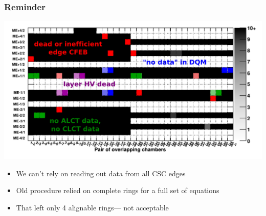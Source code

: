 \documentclass[compress]{beamer}
\begin{document}
\begin{frame}
\frametitle{Reminder}

\includegraphics[width=\linewidth]{occupancy_problems.pdf}

\begin{itemize}
\item We can't rely on reading out data from all CSC edges
\item Old procedure relied on complete rings for a full set of equations
\item That left only 4 alignable rings--- not acceptable
\end{itemize}
\end{frame}
\end{document}
